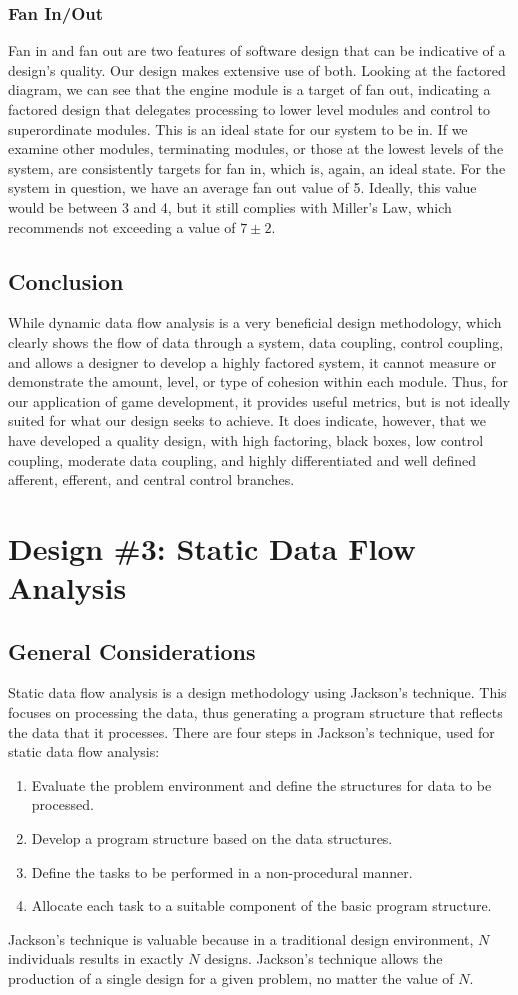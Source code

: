 \documentclass{article}
\begin{document}
		\subsubsection{Fan In/Out}
			Fan in and fan out are two features of software design that can be indicative of a design's quality. Our design makes extensive use of both. Looking at the factored diagram, we can see that the engine module is a target of fan out, indicating a factored design that delegates processing to lower level modules and control to superordinate modules. This is an ideal state for our system to be in. If we examine other modules, terminating modules, or those at the lowest levels of the system, are consistently targets for fan in, which is, again, an ideal state. For the system in question, we have an average fan out value of 5. Ideally, this value would be between 3 and 4, but it still complies with Miller's Law, which recommends not exceeding a value of $7\pm2$. 
	\subsection{Conclusion}
		While dynamic data flow analysis is a very beneficial design methodology, which clearly shows the flow of data through a system, data coupling, control coupling, and allows a designer to develop a highly factored system, it cannot measure or demonstrate the amount, level, or type of cohesion within each module. Thus, for our application of game development, it provides useful metrics, but is not ideally suited for what our design seeks to achieve. It does indicate, however, that we have developed a quality design, with high factoring, black boxes, low control coupling, moderate
data coupling, and highly differentiated and well defined afferent, efferent, and central control branches. 
%
%
\section{Design \#3: Static Data Flow Analysis}
	\subsection{General Considerations}
		Static data flow analysis is a design methodology using Jackson's technique. This focuses on processing the data, thus generating a program structure that reflects the data that it processes. There are four steps in Jackson's technique, used for static data flow analysis:
		\begin{enumerate}
			\item Evaluate the problem environment and define the structures for data to be processed. 
			\item Develop a program structure based on the data structures. 
			\item Define the tasks to be performed in a non-procedural manner. 
			\item Allocate each task to a suitable component of the basic program structure. 
		\end{enumerate}
		Jackson's technique is valuable because in a traditional design environment, $N$ individuals results in exactly $N$ designs. Jackson's technique allows the production of a single design for a given problem, no matter the value of $N$. 
\end{document}
